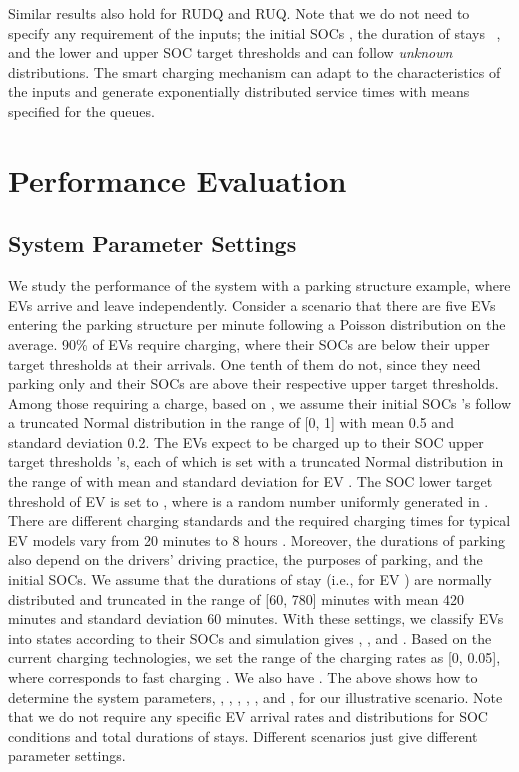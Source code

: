 \documentclass[journal]{IEEEtran}
\begin{document}
Similar results also hold for RUDQ and RUQ.
Note that we do not need to specify any requirement of the inputs; the initial SOCs , the duration of stays \ , and the lower and upper SOC target thresholds  and  can follow \textit{unknown} distributions. The smart charging mechanism can adapt to the characteristics of the inputs and generate exponentially distributed service times with means specified for the queues. 
\section{Performance Evaluation} \label{sec:perf}

\subsection{System Parameter Settings} \label{subsec:parameter}
We study the performance of the system with a parking structure example, where EVs arrive
and leave independently.  Consider a scenario that there are five EVs entering the
parking structure per minute following a Poisson distribution on the average.  90\% of EVs require charging, where their SOCs
are below their upper target thresholds at their arrivals.  One tenth of them
do not, since they need parking only and their SOCs are above their respective
upper target thresholds.  Among those requiring a charge, based on \cite{SOCdistribution}, we assume their initial SOCs 's follow a truncated Normal distribution in the range of [0, 1] with mean 0.5 and standard deviation 0.2. The EVs expect to be
charged up to their SOC upper target thresholds 's, each of which is set with a truncated Normal distribution in the range of  with mean  and standard deviation  for EV . The SOC lower target threshold  of EV  is set to , where  is a random number uniformly generated in . 
There are different charging standards and the required charging times for typical EV models vary from 20 minutes to 8 hours \cite{chargingDuration}. Moreover, the durations of parking also depend on the drivers' driving practice, the purposes of parking, and the initial SOCs. We assume that the durations of stay (i.e.,  for EV ) are normally distributed and truncated in the range of [60, 780] minutes with mean 420 minutes and standard deviation 60 minutes. With these settings, we classify EVs into states according to their SOCs and simulation gives , , and . Based on the current charging technologies, we set the range  of the charging rates as [0, 0.05], where  corresponds to fast charging \cite{fastcharging}. We also have .
The above shows how to determine the system parameters, , , , , , and , for our illustrative scenario. Note that we do not require any specific EV arrival rates and distributions for SOC conditions and total durations of stays. Different scenarios just give different parameter settings.
\end{document}
